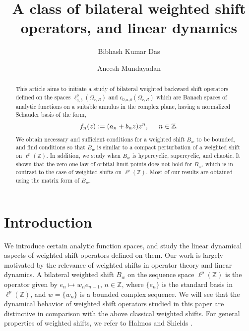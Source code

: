 \documentclass[12pt, reqno]{amsart}
\theoremstyle{definition}
\theoremstyle{remark}
\numberwithin{equation}{section}
\begin{document}

\setcounter{page}{1}

\title[Dynamics]{{A class of bilateral weighted shift operators, and linear dynamics}}

\author[Das]{Bibhash Kumar Das}
\address{Indian Institute of Technology Bhubaneswar, Jatni Rd, Khordha - 752050, India}

\author[Mundayadan]{Aneesh Mundayadan}
\address{Indian Institute of Technology Bhubaneswar, Jatni Rd, Khordha - 752050, India}







\begin{abstract}
This article aims to initiate a study of bilateral weighted backward shift operators defined on the spaces $\ell^p_{a,b}(\Omega_{r,R})$ and $c_{0,a,b}(\Omega_{r,R})$ which are Banach spaces of analytic functions on a suitable annulus in the complex plane, having a normalized Schauder basis of the form,
$$
f_n(z):=
   (a_n+b_{n}z)z^{n},\hskip 0.5cm n\in \mathbb{Z}.
   $$
We obtain necessary and sufficient conditions for a weighted shift $B_w$ to be bounded, and find conditions so that $B_w$ is similar to a compact perturbation of a weighted shift on $\ell^p(\mathbb{Z})$. In addition, we study when $B_w$ is hypercyclic, supercyclic, and chaotic. It shown that the zero-one law of orbital limit points does not hold for $B_w$, which is in contrast to the case of weighted shifts on $\ell^p(\mathbb{Z})$. Most of our results are obtained using the matrix form of $B_w$.
\end{abstract}
\maketitle

\noindent
\tableofcontents
\section{Introduction}

We introduce certain analytic function spaces, and study the linear dynamical aspects of weighted shift operators defined on them. Our work is largely motivated by the relevance of weighted shifts in operator theory and linear dynamics. A bilateral weighted shift $B_w$ on the sequence space $\ell^p(\mathbb{Z})$ is the operator given by $e_n\mapsto w_ne_{n-1}$, $n\in \mathbb{Z}$, where $\{e_n\}$ is the standard basis in $\ell^p(\mathbb{Z})$, and $w=\{w_n\}$ is a bounded complex sequence. We will see that the dynamical behavior of weighted shift operators studied in this paper are distinctive in comparison with the above classical weighted shifts.
For general properties of weighted shifts, we refer to Halmos \cite{Halmos} and Shields \cite{Shields}.
\end{document}
